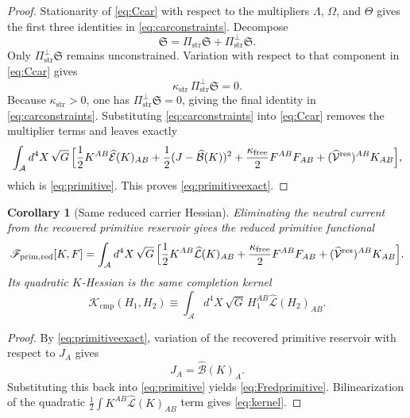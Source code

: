 \documentclass[11pt]{article}
\newcommand{\Sub}{\mathcal A}
\newcommand{\ResidualLift}{\widehat{\mathcal V}^{\mathrm{res}}}
\newcommand{\SubEinLin}{\widehat{\mathcal E}}
\newcommand{\SubGaugeVec}{\widehat{\mathcal B}}
\newcommand{\SubReducedEin}{\widehat{\mathcal L}}
\newcommand{\CompKernel}{\mathscr K_{\mathrm{cmp}}}
\newcommand{\PrimReduced}{\mathscr F_{\mathrm{prim,red}}}
\newcommand{\FreeStiff}{\kappa_{\mathrm{free}}}
\newcommand{\PrimStrain}{K}
\newcommand{\PrimNeutral}{J}
\newcommand{\PrimFree}{F}
\newcommand{\CarrierProj}{\Pi_{\mathrm{str}}}
\newcommand{\CarrierPerp}{\Pi_{\mathrm{str}}^{\perp}}
\newcommand{\CarrierGap}{\kappa_{\mathrm{str}}}
\newcommand{\CarrierSeed}{\mathfrak S}
\newcommand{\StrainMult}{\Lambda}
\newcommand{\NeutralMult}{\Omega}
\newcommand{\FreeMult}{\Theta}
\newtheorem{corollary}{Corollary}
\begin{document}
\begin{proof}
Stationarity of \eqref{eq:Ccar} with respect to the multipliers \(\StrainMult\), \(\NeutralMult\), and \(\FreeMult\) gives the first three identities in \eqref{eq:carconstraints}. Decompose
\[
\CarrierSeed=\CarrierProj\CarrierSeed+\CarrierPerp\CarrierSeed.
\]
Only \(\CarrierPerp\CarrierSeed\) remains unconstrained. Variation with respect to that component in \eqref{eq:Ccar} gives
\[
\CarrierGap\,\CarrierPerp\CarrierSeed=0.
\]
Because \(\CarrierGap>0\), one has \(\CarrierPerp\CarrierSeed=0\), giving the final identity in \eqref{eq:carconstraints}. Substituting \eqref{eq:carconstraints} into \eqref{eq:Ccar} removes the multiplier terms and leaves exactly
\[
\int_{\Sub} d^4X\,\sqrt{G}\,
\Bigl[
\frac12 \PrimStrain^{AB}\SubEinLin(\PrimStrain)_{AB}
+\frac12(\PrimNeutral-\SubGaugeVec(\PrimStrain))^2
+\frac{\FreeStiff}{2}\PrimFree^{AB}\PrimFree_{AB}
+(\ResidualLift)^{AB}\PrimStrain_{AB}
\Bigr],
\]
which is \eqref{eq:primitive}. This proves \eqref{eq:primitiveexact}.
\end{proof}

\begin{corollary}[Same reduced carrier Hessian]
\label{cor:hessian}
Eliminating the neutral current from the recovered primitive reservoir gives the reduced primitive functional
\begin{equation}
\PrimReduced[\PrimStrain,\PrimFree]
=
\int_{\Sub} d^4X\,\sqrt{G}\,
\Bigl[
\frac12 \PrimStrain^{AB}\SubReducedEin(\PrimStrain)_{AB}
+\frac{\FreeStiff}{2}\PrimFree^{AB}\PrimFree_{AB}
+(\ResidualLift)^{AB}\PrimStrain_{AB}
\Bigr].
\label{eq:Fredprimitive}
\end{equation}
Its quadratic \(\PrimStrain\)-Hessian is the same completion kernel
\begin{equation}
\CompKernel(H_1,H_2)
\equiv
\int_{\Sub} d^4X\,\sqrt{G}\,
H_1^{AB}\SubReducedEin(H_2)_{AB}.
\label{eq:kernel}
\end{equation}
\end{corollary}

\begin{proof}
By \eqref{eq:primitiveexact}, variation of the recovered primitive reservoir with respect to \(\PrimNeutral_A\) gives
\[
\PrimNeutral_A=\SubGaugeVec(\PrimStrain)_A.
\]
Substituting this back into \eqref{eq:primitive} yields \eqref{eq:Fredprimitive}. Bilinearization of the quadratic \(\frac12\int \PrimStrain^{AB}\SubReducedEin(\PrimStrain)_{AB}\) term gives \eqref{eq:kernel}.
\end{proof}
\end{document}
